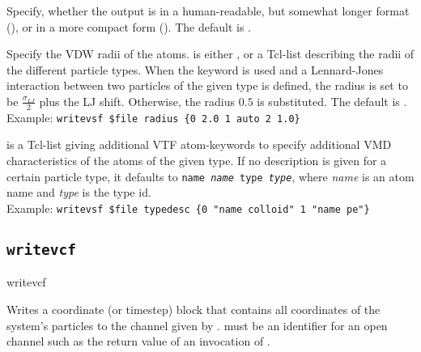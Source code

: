 \begin{arguments}
\item[\opt{\alt{short \asep verbose}}]
  Specify, whether the output is in a human-readable, but somewhat
  longer format (), or in a more compact form
  (). The default is .
  
\item[\opt{radius \alt{\var{radii} \asep auto}}] 
  Specify the VDW radii of the atoms.  is either
  , or a Tcl-list describing the radii of the different
  particle types. When the keyword  is used and a
  Lennard-Jones interaction between two particles of the given type is
  defined, the radius is set to be $\frac{\sigma_{LJ}}{2}$ plus the LJ
  shift.  Otherwise, the radius $0.5$ is substituted. The default is
  .\\
  Example: \verb!writevsf $file radius {0 2.0 1 auto 2 1.0}!
\item[\opt{typedesc \var{typedesc}}]
   is a Tcl-list giving additional VTF atom-keywords to
  specify additional VMD characteristics of the atoms of the given type.
  If no description is given for a certain particle type, it defaults to
  \texttt{name \textit{name} type \textit{type}}, where \textit{name}
  is an atom name and \textit{type} is the type id.\\
  Example: \verb!writevsf $file typedesc {0 "name colloid" 1 "name pe"}!
\end{arguments}

\subsection{\texttt{writevcf}}
\begin{essyntax}
  writevcf  
\end{essyntax}
Writes a coordinate (or timestep) block that contains all coordinates
of the system's particles to the channel given by .
 must be an identifier for an open channel such as the
return value of an invocation of .

